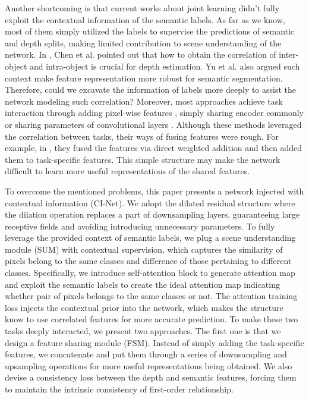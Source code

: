 \documentclass[sn-mathphys]{sn-jnl}
\theoremstyle{thmstyleone}\newtheorem{theorem}{Theorem}\newtheorem{proposition}[theorem]{Proposition}
\theoremstyle{thmstyletwo}\newtheorem{example}{Example}\newtheorem{remark}{Remark}
\theoremstyle{thmstylethree}\newtheorem{definition}{Definition}\usepackage[numbers,sort&compress]{natbib}
\begin{document}
Another shortcoming is that current works about joint learning didn't fully exploit the contextual information of the semantic labels. As far as we know, most of them simply utilized the labels to supervise the predictions of semantic and depth splits, making limited contribution to scene understanding of the network. In \cite{Chen_2021}, Chen et al. pointed out that how to obtain the correlation of inter-object and intra-object is crucial for depth estimation. Yu et al. \cite{Yu_2020} also argued such context make feature representation more robust for semantic segmentation. Therefore, could we excavate the information of labels more deeply to assist the network modeling such correlation? Moreover, most approaches achieve task interaction through adding pixel-wise features \cite{Jiao_2018,choi2020safenet}, simply sharing encoder commonly \cite{Klingner_2020} or sharing parameters of convolutional layers \cite{Zhang_2019}. Although these methods leveraged the correlation between tasks, their ways of fusing features were rough. For example, in \cite{choi2020safenet}, they fused the features via direct weighted addition and then added them to task-specific features. This simple structure may make the network difficult to learn more useful representations of the shared features.

To overcome the mentioned problems, this paper presents a network injected with contextual information (CI-Net). We adopt the dilated residual structure where the dilation operation replaces a part of downsampling layers, guaranteeing large receptive fields and avoiding introducing unnecessary parameters. To fully leverage the provided context of semantic labels, we plug a scene understanding module (SUM) with contextual supervision, which captures the similarity of pixels belong to the same classes and difference of those pertaining to different classes. Specifically, we introduce self-attention block \cite{Wang_2018,Shaw_2018} to generate attention map and exploit the semantic labels to create the ideal attention map indicating whether pair of pixels belongs to the same classes or not. The attention training loss injects the contextual prior into the network, which makes the structure know to use correlated features for more accurate prediction. To make these two tasks deeply interacted, we present two approaches. The first one is that we design a feature sharing module (FSM). Instead of simply adding the task-specific features, we concatenate and put them through a series of downsampling and upsampling operations for more useful representations being obtained. We also devise a consistency loss between the depth and semantic features, forcing them to maintain the intrinsic consistency of first-order relationship.
\end{document}
